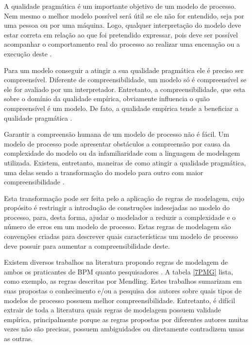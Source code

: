 \documentclass[12pt]{article}
\begin{document}
A qualidade pragmática é um importante objetivo de um modelo de processo. Nem mesmo o melhor modelo possível será útil se ele não for entendido, seja por uma pessoa ou por uma máquina. Logo, qualquer interpretação do modelo deve estar correta em relação ao que foi pretendido expressar, pois deve ser possível acompanhar o comportamento real do processo ao realizar uma encenação ou a execução deste \cite{Krogstie2012}.

Para um modelo conseguir a atingir a sua qualidade pragmática ele é preciso ser compreensível. Diferente de compreensibilidade, um modelo só é compreensível se ele for avaliado por um interpretador. Entretanto, a compreensibilidade, que esta sobre o domínio da qualidade empírica, obviamente influencia o quão compreensível é um modelo. De fato, a qualidade empírica tende a beneficiar a qualidade pragmática \cite{Krogstie2012}.

Garantir a compreensão humana de um modelo de processo não é fácil. Um modelo de processo pode apresentar obstáculos a compreensão por causa da complexidade do modelo ou da infamiliaridade com a linguagem de modelagem utilizada. Existem, entretanto, maneiras de como atingir a qualidade pragmática, uma delas sendo a transformação do modelo para outro com maior compreensibilidade \cite{Krogstie2012}. 

Esta transformação pode ser feita pelo a aplicação de regras de modelagem, cujo propósito é restringir a introdução de construções indesejadas ao modelo do processo, para, desta forma, ajudar o modelador a reduzir a complexidade e o número de erros em um modelo de processo. Estas regras de modelagem são convenções criadas para descrever quais características um modelo de processo deve possuir para aumentar a compreensibilidade deste.

Existem diversos trabalhos na literatura propondo regras de modelagem de ambos os praticantes de BPM \cite{Silver2009} \cite{White2008} \cite{Allweyer2010} quanto pesquisadores \cite{Becker2000} \cite{Mendling2007} \cite{Vanderfeesten2008} \cite{Correia2012}. A tabela \ref{7PMG} lista, como exemplo, as regras descritas por Mendling. Estes trabalhos sumarizam em suas propostas o conhecimento e/ou a pesquisa dos autores sobre quais tipos de modelos de processo possuem melhor compreensibilidade. Entretanto, é difícil extrair de toda a literatura quais regras de modelagem possuem validade empírica, principalmente porque as regras propostas por diferentes autores muitas vezes não são precisas, possuem ambiguidades ou diretamente contradizem umas as outras. 
\end{document}
